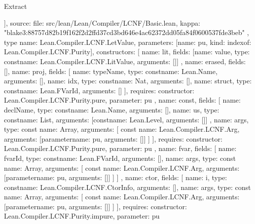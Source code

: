 \begin{lexlean}{Extract}
\begin{toolingmodule}
{{      ],
      source: {
        file: src/lean/Lean/Compiler/LCNF/Basic.lean,
        kappa: "blake3:88757d82b19f162f2d2ffd37cd3bd646e4ac62372dd05fa84f0600537fde3beb"
      }
    },
    type{
      name: Lean.Compiler.LCNF.LetValue,
      parameters: [{name: pu, kind: index{of: Lean.Compiler.LCNF.Purity}}],
      constructors: [
        {
          name: lit,
          fields: [{name: value, type: const{name: Lean.Compiler.LCNF.LitValue, arguments: []}}]
        },
        {name: erased, fields: []},
        {
          name: proj,
          fields: [
            {name: typeName, type: const{name: Lean.Name, arguments: []}},
            {name: idx, type: const{name: Nat, arguments: []}},
            {name: struct, type: const{name: Lean.FVarId, arguments: []}}
          ],
          requires: {constructor: Lean.Compiler.LCNF.Purity.pure, parameter: pu}
        },
        {
          name: const,
          fields: [
            {name: declName, type: const{name: Lean.Name, arguments: []}},
            {
              name: us,
              type: const{name: List, arguments: [const{name: Lean.Level, arguments: []}]}
            },
            {
              name: args,
              type: const{
                name: Array,
                arguments: [
                  const{
                    name: Lean.Compiler.LCNF.Arg,
                    arguments: [parameter{name: pu, arguments: []}]
                  }
                ]
              }
            }
          ],
          requires: {constructor: Lean.Compiler.LCNF.Purity.pure, parameter: pu}
        },
        {
          name: fvar,
          fields: [
            {name: fvarId, type: const{name: Lean.FVarId, arguments: []}},
            {
              name: args,
              type: const{
                name: Array,
                arguments: [
                  const{
                    name: Lean.Compiler.LCNF.Arg,
                    arguments: [parameter{name: pu, arguments: []}]
                  }
                ]
              }
            }
          ]
        },
        {
          name: ctor,
          fields: [
            {name: i, type: const{name: Lean.Compiler.LCNF.CtorInfo, arguments: []}},
            {
              name: args,
              type: const{
                name: Array,
                arguments: [
                  const{
                    name: Lean.Compiler.LCNF.Arg,
                    arguments: [parameter{name: pu, arguments: []}]
                  }
                ]
              }
            }
          ],
          requires: {constructor: Lean.Compiler.LCNF.Purity.impure, parameter: pu}
}}}
\end{toolingmodule}
\end{lexlean}
